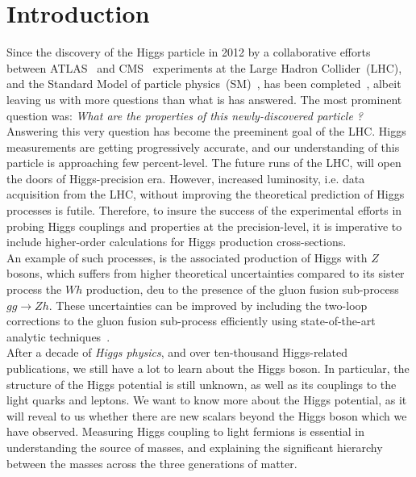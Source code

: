 

\chapter{Introduction}
Since the discovery of the Higgs particle in 2012 by a collaborative efforts between ATLAS~\cite{ATLAS:2012yve} and CMS~\cite{CMS:2012qbp} experiments at the { L}arge { H}adron {C}ollider~(LHC), and the Standard Model of particle physics~(SM)~\cite{salam1,salam2,PhysRevLett.19.1264}, has been completed~\cite{PhysRevLett.13.321,PhysRevLett.13.508,HIGGS1964132,PhysRevLett.13.585,Guralnik:2009jd}, albeit leaving us with more questions than what is has answered. The most prominent question was: \textit{What are the properties of this newly-discovered particle ?}\\
%
Answering this very question has become the preeminent goal of the LHC. Higgs measurements are getting progressively accurate, and our understanding of this particle is approaching few percent-level. The future runs of the LHC, will open the doors of Higgs-precision era. However, increased luminosity, i.e. data acquisition from the LHC, without improving the theoretical prediction of Higgs processes is futile. Therefore, to insure the success of the experimental efforts in probing Higgs couplings and properties at the precision-level, it is imperative to include higher-order calculations for Higgs production cross-sections. \\ 
An example of such processes, is the associated production of Higgs with $Z$ bosons, which suffers from higher theoretical uncertainties compared to its sister process the $Wh$ production, deu to the presence of the gluon fusion sub-process $ gg \to Zh$. These uncertainties can be improved by including the two-loop corrections to the gluon fusion sub-process efficiently using state-of-the-art analytic techniques~\cite{Bonciani:2018omm}. 
%
 \\ After a decade of \emph{Higgs physics}, and over ten-thousand Higgs-related publications, we still have a lot to learn about the Higgs boson.  In particular,  the structure of the Higgs potential is still unknown, as well as its couplings to the light quarks and leptons. We want to know more about the Higgs potential, as it will reveal to us whether there are new scalars beyond the Higgs boson which we have observed. Measuring Higgs coupling to light fermions is essential in understanding the source of masses, and explaining the significant hierarchy between the  masses across the three generations of matter. \\ 
